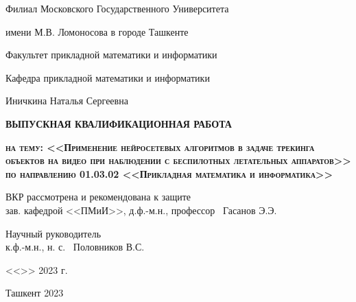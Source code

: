 \begin{titlepage}

\newpage

\begin{center}
Филиал Московского Государственного Университета

имени М.В. Ломоносова в городе Ташкенте

Факультет прикладной математики и информатики

Кафедра прикладной математики и информатики

\hrulefill
\end{center}

\vspace{3em}

\begin{center}
\large Иничкина Наталья Сергеевна
\end{center}

\vspace{2em}

\begin{center}
\textsc{\textbf{ВЫПУСКНАЯ КВАЛИФИКАЦИОННАЯ РАБОТА}}
\end{center}

\begin{center}
\textsc{\textbf{на тему: <<Применение нейросетевых алгоритмов в задаче трекинга объектов на видео при наблюдении с беспилотных летательных аппаратов>> \\ по направлению 01.03.02 <<Прикладная математика и информатика>>}}
\end{center}

\vspace{3em}

\begin{flushleft}
ВКР рассмотрена и рекомендована к защите\\
зав. кафедрой <<ПМиИ>>, д.ф.-м.н., профессор
\hrulefill \ Гасанов Э.Э.
\end{flushleft}

\vspace{0.1em}

\begin{flushleft}
Научный руководитель\\
к.ф.-м.н., н. с.
\hrulefill \ Половников В.С.
\end{flushleft}

\vspace{0.1em}

\begin{flushright}
<<\underline{\hspace{1cm}}>> \underline{\hspace{3cm}} 2023 г.
\end{flushright}

\vspace{\fill}

\begin{center}
Ташкент 2023
\end{center}

\end{titlepage}
